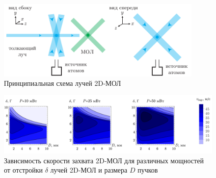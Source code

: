 \begin{minipage}{0.65\textwidth}
    \vspace{-1mm}

    \begin{figure}[h]
        \centering
        \includegraphics[width=0.9\textwidth]{../MOT/figs/2dmot_v3.pdf}
        \vspace{1mm}
        \caption{Принципиальная схема лучей 2D-МОЛ}
        \label{fig:2dmots}
    \end{figure}

    \vspace{-8mm}

    \begin{figure}[h]
        \centering
        \includegraphics[width=1.0\textwidth]{../MOT/figs/vcap2d_delta-Ds.png}
        \caption{Зависимость скорости захвата 2D-МОЛ для различных мощностей от отстройки $\delta$ лучей 2D-МОЛ и размера $D$ пучков}
    \end{figure}
\end{minipage}
\hfill
